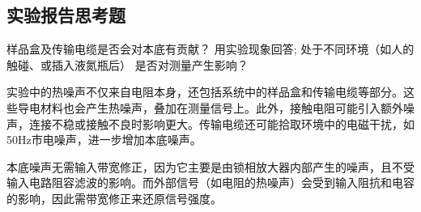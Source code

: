 \documentclass[dvipsnames, svgnames,a4paper,11pt]{article}
\begin{document}












\clearpage
\subsection{实验报告思考题}


\begin{question}
	样品盒及传输电缆是否会对本底有贡献？ 用实验现象回答; 处于不同环境（如人的触碰、或插入液氮瓶后） 是否对测量产生影响？
\end{question}

	实验中的热噪声不仅来自电阻本身，还包括系统中的样品盒和传输电缆等部分。这些导电材料也会产生热噪声，叠加在测量信号上。此外，接触电阻可能引入额外噪声，连接不稳或接触不良时影响更大。传输电缆还可能拾取环境中的电磁干扰，如50Hz市电噪声，进一步增加本底噪声。

	本底噪声无需输入带宽修正，因为它主要是由锁相放大器内部产生的噪声，且不受输入电路阻容滤波的影响。而外部信号（如电阻的热噪声）会受到输入阻抗和电容的影响，因此需带宽修正来还原信号强度。
\end{document}
